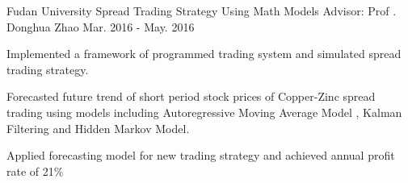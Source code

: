 \begin{cventries}
 \cventry
 {Fudan University} %
    {Spread Trading Strategy Using Math Models} %
{Advisor: Prof . Donghua Zhao} %
    {Mar. 2016 - May. 2016} %
    {
      \begin{cvitems} %
	\item {Implemented a framework of programmed trading system and simulated spread trading strategy.}
	\item {Forecasted future trend of short period stock prices of Copper-Zinc spread trading using models including Autoregressive Moving Average Model , Kalman Filtering and Hidden Markov Model.}
	\item {Applied forecasting model for new trading strategy and achieved annual profit rate of 21\%}
      \end{cvitems}
     }
    
\end{cventries}
